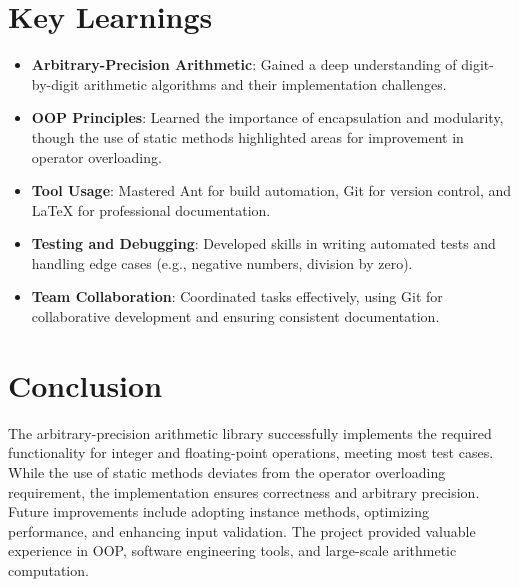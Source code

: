 \documentclass[12pt]{article}
\begin{document}
\section{Key Learnings}
\begin{itemize}
    \item \textbf{Arbitrary-Precision Arithmetic}: Gained a deep understanding of digit-by-digit arithmetic algorithms and their implementation challenges.
    \item \textbf{OOP Principles}: Learned the importance of encapsulation and modularity, though the use of static methods highlighted areas for improvement in operator overloading.
    \item \textbf{Tool Usage}: Mastered Ant for build automation, Git for version control, and LaTeX for professional documentation.
    \item \textbf{Testing and Debugging}: Developed skills in writing automated tests and handling edge cases (e.g., negative numbers, division by zero).
    \item \textbf{Team Collaboration}: Coordinated tasks effectively, using Git for collaborative development and ensuring consistent documentation.
\end{itemize}

\section{Conclusion}
The arbitrary-precision arithmetic library successfully implements the required functionality for integer and floating-point operations, meeting most test cases. While the use of static methods deviates from the operator overloading requirement, the implementation ensures correctness and arbitrary precision. Future improvements include adopting instance methods, optimizing performance, and enhancing input validation. The project provided valuable experience in OOP, software engineering tools, and large-scale arithmetic computation.
\end{document}
